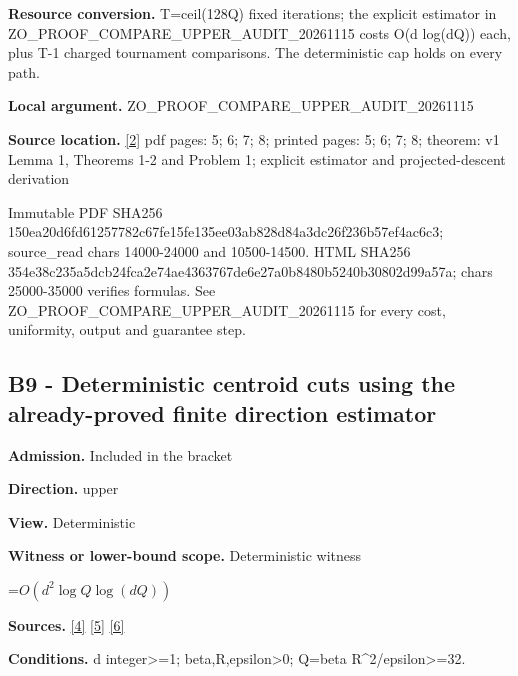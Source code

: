 \documentclass[10pt,a4paper]{article}
\newcommand{\AtlasMath}[1]{\par\begingroup\centering\setbox0=\hbox{$\displaystyle #1$}\ifdim\wd0>1.4\linewidth\typeout{ATLAS WIDE FORMULA: \the\wd0}\fi\ifdim\wd0>\linewidth\resizebox{\linewidth}{!}{\box0}\else\box0\fi\par\endgroup}
\begin{document}
\textbf{Resource conversion.} T=ceil(128Q) fixed iterations; the explicit estimator in ZO\_PROOF\_COMPARE\_UPPER\_AUDIT\_20261115 costs O(d log(dQ)) each, plus T-1 charged tournament comparisons. The deterministic cap holds on every path.



\textbf{Local argument.} ZO\_PROOF\_COMPARE\_UPPER\_AUDIT\_20261115



\textbf{Source location.} \href{https://arxiv.org/html/2405.11454v1}{[2]} pdf pages: 5; 6; 7; 8; printed pages: 5; 6; 7; 8; theorem: v1 Lemma 1, Theorems 1-2 and Problem 1; explicit estimator and projected-descent derivation



Immutable PDF SHA256 150ea20d6fd61257782c67fe\allowbreak{}15fe135ee03ab828d84a3dc2\allowbreak{}6f236b57ef4ac6c3; source\_read chars 14000-24000 and 10500-14500. HTML SHA256 354e38c235a5dcb24fca2e74\allowbreak{}ae4363767de6e27a0b8480b5\allowbreak{}240b30802d99a57a; chars 25000-35000 verifies formulas. See ZO\_PROOF\_COMPARE\_UPPER\_AUDIT\_20261115 for every cost, uniformity, output and guarantee step.



\subsection{B9 - Deterministic centroid cuts using the already-proved finite direction estimator}


\textbf{Admission.} Included in the bracket



\textbf{Direction.} upper



\textbf{View.} Deterministic



\textbf{Witness or lower-bound scope.} Deterministic witness



\AtlasMath{O(d^2\log Q\log(dQ))}


\textbf{Sources.} \href{https://arxiv.org/pdf/1405.4980v2}{[4]} \href{https://arxiv.org/html/2611.29533v1}{[5]} \href{https://github.com/WU-Wendao/Colombo/blob/main/colombo_sensorium/Complexity_altas/data/sources/colombo/COLOMBO_KIMI_002/kimi_002.pdf}{[6]}



\textbf{Conditions.} d integer>=1; beta,R,epsilon>0; Q=beta R\textasciicircum{}2/epsilon>=32.
\end{document}
